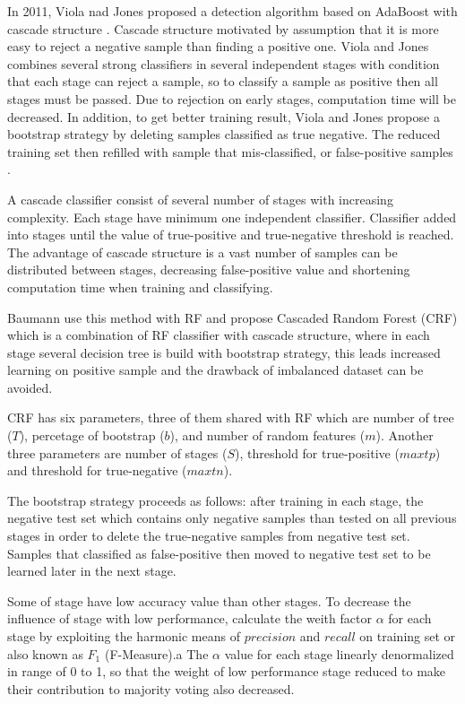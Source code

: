 \documentclass[conference,compsoc,a4paper,twocolumn,final]{IEEEtran}
\begin{document}
In 2011, Viola nad Jones proposed a detection algorithm based on AdaBoost with
cascade structure \cite{viola2004robust}.
Cascade structure motivated by assumption that it is more easy to reject a
negative sample than finding a positive one.
Viola and Jones combines several strong classifiers in several independent
stages with condition that each stage can reject a sample, so to classify a
sample as positive then all stages must be passed.
Due to rejection on early stages, computation time will be decreased.
In addition, to get better training result, Viola and Jones propose a bootstrap
strategy by deleting samples classified as true negative.
The reduced training set then refilled with sample that mis-classified, or
false-positive samples
\cite{viola2004robust}.

A cascade classifier consist of several number of stages with increasing
complexity.
Each stage have minimum one independent classifier.
Classifier added into stages until the value of true-positive and true-negative
threshold is reached.
The advantage of cascade structure is a vast number of samples can be
distributed between stages, decreasing false-positive value and shortening
computation time when training and classifying.

Baumann use this method with RF and propose Cascaded Random Forest (CRF) which
is a combination of RF classifier with cascade structure, where in each stage
several decision tree is build with bootstrap strategy, this leads increased
learning on positive sample and the drawback of imbalanced dataset can be
avoided.
\cite{baumann2013cascaded}

CRF has six parameters, three of them shared with RF which are number of tree
($T$), percetage of bootstrap ($b$), and number of random features ($m$).
Another three parameters are number of stages ($S$), threshold
for true-positive ($maxtp$) and threshold for true-negative ($maxtn$).

The bootstrap strategy proceeds as follows: after training in each stage, the
negative test set which contains only negative samples than tested on all
previous stages in order to delete the true-negative samples from
negative test set.
Samples that classified as false-positive then moved to negative test set to be
learned later in the next stage.

Some of stage have low accuracy value than other stages.
To decrease the influence of stage with low performance, calculate the weith
factor $\alpha$ for each stage by exploiting the harmonic means of $precision$
and $recall$ on training set or also known as $F_1$ (F-Measure).a
The $\alpha$ value for each stage linearly denormalized in range of 0 to 1, so
that the weight of low performance stage reduced to make their contribution to
majority voting also decreased.
\end{document}
